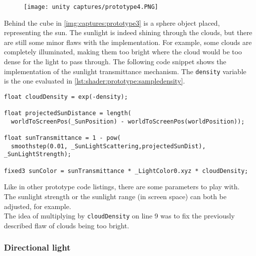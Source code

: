 \begin{figure}[H]
    \centering
    \texttt{[image: unity captures/prototype4.PNG]}
    \label{img:captures:prototype3}
\end{figure}

\noindent
Behind the cube in \autoref{img:captures:prototype3} is a sphere object placed, representing the sun. The sunlight is indeed shining through the clouds, but there are still some minor flaws with the implementation.
For example, some clouds are completely illuminated, making them too bright where the cloud would be too dense for the light to pass through.
\emptyline
The following code snippet shows the implementation of the sunlight transmittance mechanism. The \lstinline[language=HLSL]{density} variable is the one evaluated in \autoref{lst:shader:prototype:sampledensity}.

\begin{lstlisting}[language=HLSL, caption=Implementation of a sunlight transmittance mechanism., label=lst:shader:prototype:sampledensity]
float cloudDensity = exp(-density);

float projectedSunDistance = length(
  worldToScreenPos(_SunPosition) - worldToScreenPos(worldPosition));

float sunTransmittance = 1 - pow(
  smoothstep(0.01, _SunLightScattering,projectedSunDist), _SunLightStrength);

fixed3 sunColor = sunTransmittance * _LightColor0.xyz * cloudDensity;
\end{lstlisting}

\noindent
Like in other prototype code listings, there are some \gls{parameters} to play with. The sunlight strength or the sunlight range (in screen space) can both be adjusted, for example.
\\
The idea of multiplying by \lstinline[language=HLSL]{cloudDensity} on line 9 was to fix the previously described flaw of clouds being too bright. 

\clearpage
\subsubsection{Directional light}


